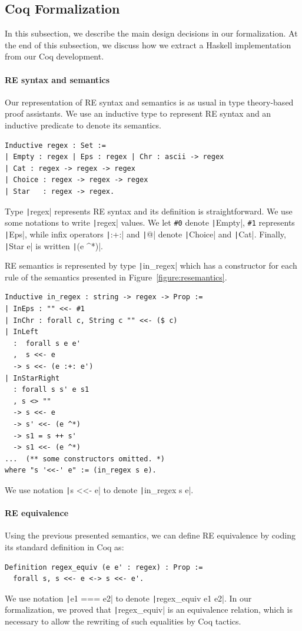 \documentclass[oneside,12pt]{scrbook}
\theoremstyle{definition}
\newcommand{\coq}[1]{\texttt|#1|}
\theoremstyle{plain}
\theoremstyle{definition}
\begin{document}
\subsection{Coq Formalization}\label{subsection:coqformalization}

In this subsection, we describe the main design decisions in our formalization. At
the end of this subsection, we discuss how we extract a Haskell implementation from
our Coq development.

\paragraph{RE syntax and semantics} Our representation of RE syntax and
semantics is as usual in type theory-based proof assistants. We use an inductive
type to represent RE syntax and an inductive predicate to denote its semantics.

\begin{verbatim}
Inductive regex : Set :=
| Empty : regex | Eps : regex | Chr : ascii -> regex
| Cat : regex -> regex -> regex
| Choice : regex -> regex -> regex
| Star   : regex -> regex.
\end{verbatim}

Type \coq{regex} represents RE syntax and its definition is straightforward.
We use some notations to write \coq{regex} values. We let \verb|#0| denote
\coq{Empty}, \verb|#1| represents \coq{Eps}, while infix operators \coq{:+:} and
\coq{@} denote \coq{Choice} and \coq{Cat}. Finally, \coq{Star e} is
written \coq{(e ^*)}.

RE semantics is represented by type \coq{in_regex} which has a constructor for each
rule of the semantics presented in Figure~\ref{figure:resemantics}.

\begin{verbatim}
Inductive in_regex : string -> regex -> Prop :=
| InEps : "" <<- #1
| InChr : forall c, String c "" <<- ($ c)
| InLeft
  :  forall s e e'
  ,  s <<- e
  -> s <<- (e :+: e')
| InStarRight              
  : forall s s' e s1 
  , s <> ""  
  -> s <<- e
  -> s' <<- (e ^*)
  -> s1 = s ++ s'
  -> s1 <<- (e ^*)
...  (** some constructors omitted. *)
where "s '<<-' e" := (in_regex s e).
\end{verbatim}
We use notation \coq{s <<- e} to denote \coq{in_regex s e}.

\paragraph{RE equivalence} Using the previous presented semantics, we can define
RE equivalence by coding its standard definition in Coq as:
\begin{verbatim}
Definition regex_equiv (e e' : regex) : Prop :=
  forall s, s <<- e <-> s <<- e'.
\end{verbatim}
We use notation \coq{e1 === e2} to denote \coq{regex_equiv e1 e2}. In our
formalization, we proved that \coq{regex_equiv} is an equivalence relation,
which is necessary to allow the rewriting of such equalities by Coq
tactics.
\end{document}
